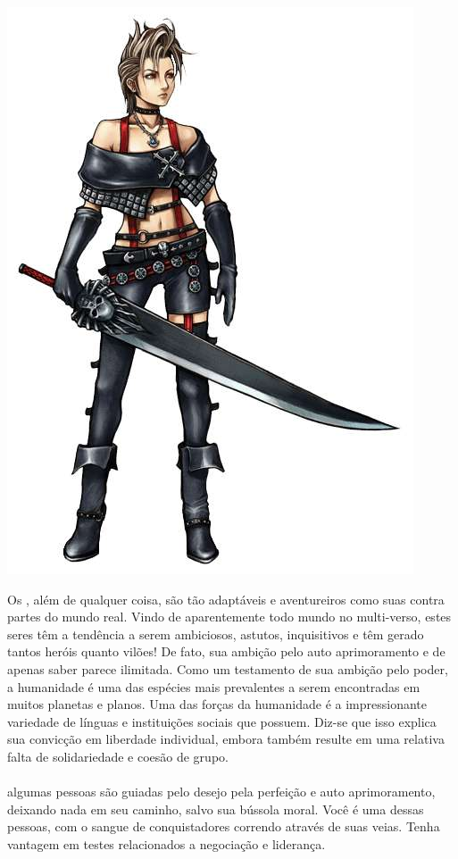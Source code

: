 \begin{center} \includegraphics[width=0.9\columnwidth]{./art/races/human.jpg} \end{center}
%
Os , além de qualquer coisa, são tão adaptáveis e aventureiros como suas contra partes do mundo real.
Vindo de aparentemente todo mundo no multi-verso, estes seres têm a tendência a serem ambiciosos, astutos, inquisitivos e têm gerado tantos heróis quanto vilões!
De fato, sua ambição pelo auto aprimoramento e de apenas saber parece ilimitada. 
Como um testamento de sua ambição pelo poder, a humanidade é uma das espécies mais prevalentes a serem encontradas em muitos planetas e planos.
Uma das forças da humanidade é a impressionante variedade de línguas e instituições sociais que possuem.
Diz-se que isso explica sua convicção em liberdade individual, embora também resulte em uma relativa falta de solidariedade e coesão de grupo.
\\\\
 algumas pessoas são guiadas pelo desejo pela perfeição e auto aprimoramento, deixando nada em seu caminho, salvo sua bússola moral. Você é uma dessas pessoas, com o sangue de conquistadores correndo através de suas veias. Tenha vantagem em testes relacionados a negociação e liderança.
